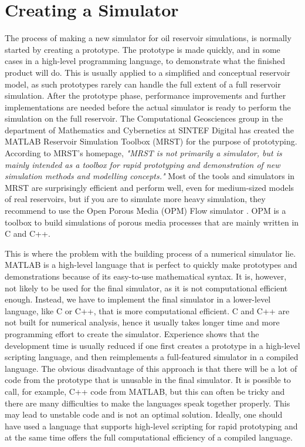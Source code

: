 \section{Creating a Simulator}
The process of making a new simulator for oil reservoir simulations, is normally started by creating a prototype. The prototype is made quickly, and in some cases in a high-level programming language, to demonstrate what the finished product will do. This is usually applied to a simplified and conceptual reservoir model, as such prototypes rarely can handle the full extent of a full reservoir simulation. After the prototype phase, performance improvements and further implementations are needed before the actual simulator is ready to perform the simulation on the full reservoir. The Computational Geosciences group in the department of Mathematics and Cybernetics at SINTEF Digital has created the MATLAB Reservoir Simulation Toolbox (MRST) \emph{\citep{mrstHomepage}} for the  purpose of prototyping. According to MRST's homepage, \textit{"MRST is not primarily a simulator, but is mainly intended as a toolbox for rapid prototyping and demonstration of new simulation methods and modelling concepts."} Most of the tools and simulators in MRST are surprisingly efficient and perform well, even for medium-sized models of real reservoirs, but if you are to simulate more heavy simulation, they recommend to use the Open Porous Media (OPM) Flow simulator \emph{\citep{opm}}. OPM is a toolbox to build simulations of porous media processes that are mainly written in C and C++. 

This is where the problem with the building process of a numerical simulator lie. MATLAB is a high-level language that is perfect to quickly make prototypes and demonstrations because of its easy-to-use mathematical syntax. It is, however, not likely to be used for the final simulator, as it is not computational efficient enough. Instead, we have to implement the final simulator in a lower-level language, like C or C++, that is more computational efficient. C and C++ are not built for numerical analysis, hence it usually takes longer time and more programming effort to create the simulator. Experience shows that the development time is usually reduced if one first creates a prototype in a high-level scripting language, and then reimplements a full-featured simulator in a compiled language. The obvious disadvantage of this approach is that there will be a lot of code from the prototype that is unusable in the final simulator. It is possible to call, for example, C++ code from MATLAB, but this can often be tricky and there are many difficulties to make the languages speak together properly. This may lead to unstable code and is not an optimal solution. Ideally, one should have used a language that supports high-level scripting for rapid prototyping and at the same time offers the full computational efficiency of a compiled language.

